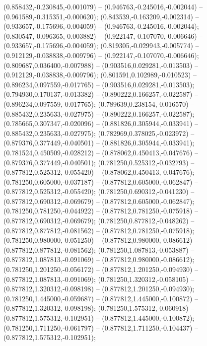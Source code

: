  (0.858432,-0.230845,-0.001079) -- (0.946763,-0.245016,-0.002044) -- (0.961589,-0.315351,-0.000620);
 (0.843539,-0.163209,-0.002314) -- (0.933657,-0.175696,-0.004059) -- (0.946763,-0.245016,-0.002044);
 (0.830547,-0.096365,-0.003882) -- (0.922147,-0.107070,-0.006646) -- (0.933657,-0.175696,-0.004059);
 (0.819305,-0.029943,-0.005774) -- (0.912129,-0.038838,-0.009796) -- (0.922147,-0.107070,-0.006646);
 (0.809687,0.036400,-0.007988) -- (0.903516,0.029281,-0.013503) -- (0.912129,-0.038838,-0.009796);
 (0.801591,0.102989,-0.010523) -- (0.896234,0.097559,-0.017765) -- (0.903516,0.029281,-0.013503);
 (0.794930,0.170137,-0.013382) -- (0.890222,0.166257,-0.022587) -- (0.896234,0.097559,-0.017765);
 (0.789639,0.238154,-0.016570) -- (0.885432,0.235633,-0.027975) -- (0.890222,0.166257,-0.022587);
 (0.785665,0.307347,-0.020096) -- (0.881826,0.305944,-0.033941) -- (0.885432,0.235633,-0.027975);
 (0.782969,0.378025,-0.023972) -- (0.879376,0.377449,-0.040501) -- (0.881826,0.305944,-0.033941);
 (0.781524,0.450509,-0.028212) -- (0.878062,0.450413,-0.047676) -- (0.879376,0.377449,-0.040501);
 (0.781250,0.525312,-0.032793) -- (0.877812,0.525312,-0.055420) -- (0.878062,0.450413,-0.047676);
 (0.781250,0.605000,-0.037187) -- (0.877812,0.605000,-0.062847) -- (0.877812,0.525312,-0.055420);
 (0.781250,0.690312,-0.041230) -- (0.877812,0.690312,-0.069679) -- (0.877812,0.605000,-0.062847);
 (0.781250,0.781250,-0.044922) -- (0.877812,0.781250,-0.075918) -- (0.877812,0.690312,-0.069679);
 (0.781250,0.877812,-0.048262) -- (0.877812,0.877812,-0.081562) -- (0.877812,0.781250,-0.075918);
 (0.781250,0.980000,-0.051250) -- (0.877812,0.980000,-0.086612) -- (0.877812,0.877812,-0.081562);
 (0.781250,1.087813,-0.053887) -- (0.877812,1.087813,-0.091069) -- (0.877812,0.980000,-0.086612);
 (0.781250,1.201250,-0.056172) -- (0.877812,1.201250,-0.094930) -- (0.877812,1.087813,-0.091069);
 (0.781250,1.320312,-0.058105) -- (0.877812,1.320312,-0.098198) -- (0.877812,1.201250,-0.094930);
 (0.781250,1.445000,-0.059687) -- (0.877812,1.445000,-0.100872) -- (0.877812,1.320312,-0.098198);
 (0.781250,1.575312,-0.060918) -- (0.877812,1.575312,-0.102951) -- (0.877812,1.445000,-0.100872);
 (0.781250,1.711250,-0.061797) -- (0.877812,1.711250,-0.104437) -- (0.877812,1.575312,-0.102951);
